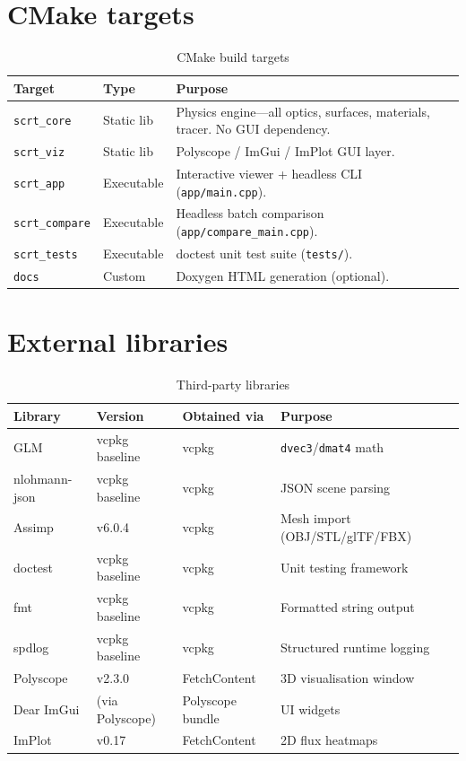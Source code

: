 \documentclass[12pt,a4paper]{report}
\begin{document}
\section{CMake targets}

\begin{table}[H]\centering
\caption{CMake build targets}
\begin{tabular}{llp{7cm}}
\toprule
Target & Type & Purpose \\
\midrule
\texttt{scrt\_core} & Static lib & Physics engine—all optics, surfaces, materials, tracer.  No GUI dependency. \\
\texttt{scrt\_viz}  & Static lib & Polyscope / ImGui / ImPlot GUI layer. \\
\texttt{scrt\_app}  & Executable & Interactive viewer + headless CLI (\texttt{app/main.cpp}). \\
\texttt{scrt\_compare} & Executable & Headless batch comparison (\texttt{app/compare\_main.cpp}). \\
\texttt{scrt\_tests}   & Executable & doctest unit test suite (\texttt{tests/}). \\
\texttt{docs}          & Custom & Doxygen HTML generation (optional). \\
\bottomrule
\end{tabular}
\end{table}

\section{External libraries}

\begin{table}[H]\centering
\caption{Third-party libraries}
\begin{tabular}{llll}
\toprule
Library & Version & Obtained via & Purpose \\
\midrule
GLM              & vcpkg baseline & vcpkg        & \texttt{dvec3}/\texttt{dmat4} math \\
nlohmann-json    & vcpkg baseline & vcpkg        & JSON scene parsing \\
Assimp           & v6.0.4         & vcpkg        & Mesh import (OBJ/STL/glTF/FBX) \\
doctest          & vcpkg baseline & vcpkg        & Unit testing framework \\
fmt              & vcpkg baseline & vcpkg        & Formatted string output \\
spdlog           & vcpkg baseline & vcpkg        & Structured runtime logging \\
Polyscope        & v2.3.0         & FetchContent & 3D visualisation window \\
Dear ImGui       & (via Polyscope)& Polyscope bundle & UI widgets \\
ImPlot           & v0.17          & FetchContent & 2D flux heatmaps \\
\bottomrule
\end{tabular}
\end{table}
\end{document}
